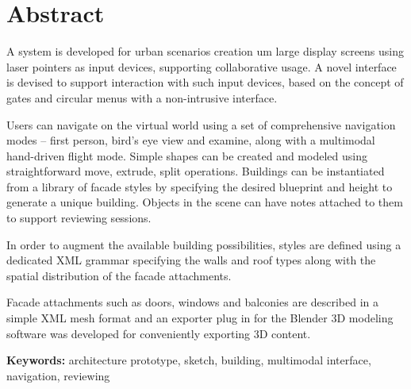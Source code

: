 \chapter*{Abstract}




A system is developed for urban scenarios creation um large display screens using laser
pointers as input devices, supporting collaborative usage.
A novel interface is devised to support interaction with such input devices,
based on the concept of gates and circular menus with a non-intrusive interface.



Users can navigate on the virtual world using a set of comprehensive navigation modes
-- first person, bird's eye view and examine, along with a multimodal hand-driven flight mode.
Simple shapes can be created and modeled using straightforward move, extrude, split operations.
Buildings can be instantiated from a library of facade styles by specifying
the desired blueprint and height to generate a unique building.
Objects in the scene can have notes attached to them to support reviewing sessions.

In order to augment the available building possibilities, styles are defined using a dedicated XML grammar
specifying the walls and roof types along with the spatial distribution of the facade attachments.

Facade attachments such as doors, windows and balconies are described in
a simple XML mesh format and an exporter plug in for the Blender 3D modeling software was developed
for conveniently exporting 3D content.







\textbf{Keywords:} architecture prototype, sketch, building, multimodal interface, navigation, reviewing
